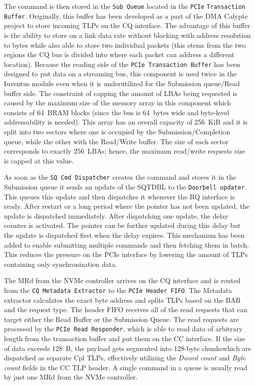 The command is then stored in the \verb|Sub Queue| located in the \verb|PCIe| \verb|Transaction|
\verb|Buffer|. Originally, this buffer has been developed as a part of the DMA Calypte
project\cite{calypte_github} to store incoming \acp{TLP} on the \ac{CQ} interface. The advantage of
this buffer is the ability to store on a link data rate without blocking with address resolution to
bytes while also able to store two individual packets (this stems from the two regions the CQ bus is
divided into where each packet can address a different location). Because the reading side of the
\verb|PCIe Transaction Buffer| has been designed to put data on a streaming bus, this component is
used twice in the Iuventus module even when it is underutilized for the Submission queue/Read buffer
side. The constraint of capping the amount of \acp{LBA} being requested is caused by the maximum
size of the memory array in this component which consists of 64~BRAM blocks (since the bus is
64~bytes wide and byte-level addressability is needed). This array has an overall capacity of
256~KiB and it is split into two sectors where one is occupied by the Submission/Completion queue,
while the other with the Read/Write buffer. The size of each sector corresponds to exactly 256~LBAs;
hence, the maximum read/write requests size is capped at this value.

As soon as the \verb|SQ Cmd Dispatcher| creates the command and stores it in the Submission queue it
sends an update of the \ac{SQTDBL} to the \verb|Doorbell updater|. This queues this update and then
dispatches it whenever the \ac{RQ} interface is ready. After restart or a long period where the
pointer has not been updated, the update is dispatched immediately. After dispatching one update,
the delay counter is activated. The pointer can be further updated during this delay but the update
is dispatched first when the delay expires. This mechanism has been added to enable submitting
multiple commands and then fetching them in batch. This reduces the pressure on the PCIe interface
by lowering the amount of \acp{TLP} containing only synchronization data.

The \acl{MRd} from the NVMe controller arrives on the CQ interface and is routed from the
\verb|CQ Metadata Extractor| to the \verb|PCIe Header FIFO|. The Metadata extractor calculates the
exact byte address and splits TLPs based on the BAR and the request type. The header FIFO receives
all of the read requests that can target either the Read Buffer or the Submission Queue. The read
requests are processed by the \verb|PCIe Read Responder|, which is able to read data of arbitrary
length from the transaction buffer and put them on the \ac{CC} interface. If the size of data
exceeds 128~B, the payload gets segmented into 128-byte chunks\footnotemark\@ which are dispatched
as separate \ac{Cpl} \acp{TLP}, effectively utilizing the \emph{Dword count} and \emph{Byte count}
fields in the \ac{CC} \ac{TLP} header. A single command in a queue is usually read by just one
\ac{MRd} from the NVMe controller.

